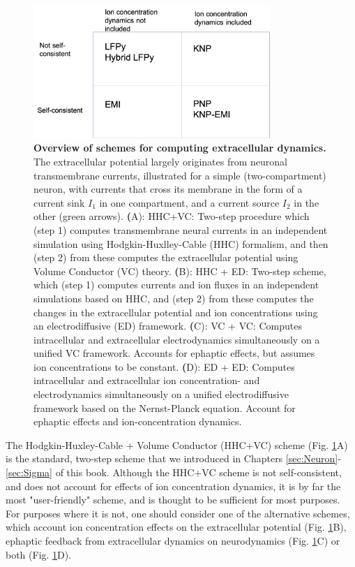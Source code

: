 \begin{figure}[!ht]
\begin{center}
\includegraphics[width=0.8\textwidth]{Figures/Schemes/schemes.png}
\end{center}
\caption{\textbf{Overview of schemes for computing extracellular dynamics.} The extracellular potential largely originates from neuronal transmembrane currents, illustrated for a simple (two-compartment) neuron, with currents that cross its membrane in the form of a current sink $I_1$ in one compartment, and a current source $I_2$ in the other (green arrows). {\textbf (A)}: HHC+VC: Two-step procedure which (step 1) computes transmembrane neural currents in an independent simulation using Hodgkin-Huxlley-Cable (HHC) formalism, and then (step 2) from these computes the extracellular potential using Volume Conductor (VC) theory. {\textbf (B)}: HHC + ED: Two-step scheme, which (step 1) computes currents and ion fluxes in an independent simulations based on HHC, and (step 2) from these computes the changes in the extracellular potential and ion concentrations using an electrodiffusive (ED) framework. {\textbf (C)}: VC + VC: Computes intracellular and extracellular electrodynamics simultaneously on a unified VC framework. Accounts for ephaptic effects, but assumes ion concentrations to be constant. {\textbf (D)}: ED + ED: Computes intracellular and extracellular ion concentration- and electrodynamics simultaneously on a unified electrodiffusive framework based on the Nernst-Planck equation. Account for ephaptic effects and ion-concentration dynamics. 
}
\label{Schemes:fig:schemes}
\end{figure}

The Hodgkin-Huxley-Cable + Volume Conductor (HHC+VC) scheme (Fig. \ref{Schemes:fig:schemes}A) is the standard, two-step scheme that we introduced in Chapters \ref{sec:Neuron}-\ref{sec:Sigma} of this book. Although the HHC+VC scheme is not self-consistent, and does not account for effects of ion concentration dynamics, it is by far the most "user-friendly" scheme, and is thought to be sufficient for most purposes. For purposes where it is not, one should consider one of the alternative schemes, which account ion concentration effects on the extracellular potential (Fig. \ref{Schemes:fig:schemes}B), ephaptic feedback from extracellular dynamics on neurodynamics (Fig. \ref{Schemes:fig:schemes}C) or both (Fig. \ref{Schemes:fig:schemes}D).

